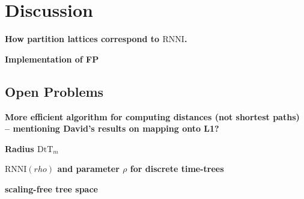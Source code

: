 \documentclass[11pt]{amsart}
\newcommand{\rnni}{\mathrm{RNNI}}
\newcommand{\dtt}{\mathrm{DtT}}
\newcommand{\summary}[1]{\textbf{#1}} %
\begin{document}
\section{Discussion}

\summary{How partition lattices correspond to $\rnni$.}

\summary{Implementation of FP}

\subsection{Open Problems}

\summary{More efficient algorithm for computing distances (not shortest paths) -- mentioning David's results on mapping onto L1?}

\summary{Radius $\dtt_m$}

\summary{$\rnni(rho)$ and parameter $\rho$ for discrete time-trees}

\summary{scaling-free tree space}
\end{document}
